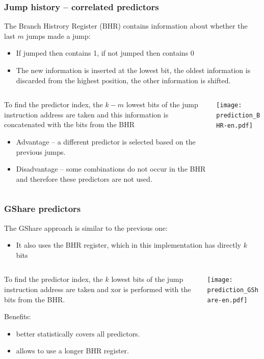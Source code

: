 \documentclass{beamer}
\begin{document}
\begin{frame}
\frametitle{Jump history -- correlated predictors}

The Branch Histrory Register (BHR) contains information about whether the last $m$ jumps made a jump:
\begin{itemize}
\item If jumped then contains 1, if not jumped then contains 0
\item The new information is inserted at the lowest bit, the oldest information is discarded from the highest position, the other information is shifted.
\end{itemize}

\begin{columns}[T]
\begin{column}{0.5\textwidth}
\small
To find the predictor index, the $k-m$ lowest bits of the jump instruction address are taken and this information is concatenated with the bits from the BHR
\begin{itemize}
\item Advantage -- a different predictor is selected based on the previous jumps.
\item Disadvantage -- some combinations do not occur in the BHR and therefore these predictors are not used.
\end{itemize}
\end{column}
\begin{column}{0.5\textwidth}
\texttt{[image: prediction\_BHR-en.pdf]}
\end{column}
\end{columns}

\end{frame}

\begin{frame}
\frametitle{GShare predictors}

The GShare approach is similar to the previous one:
\begin{itemize}
\item It also uses the BHR register, which in this implementation has directly $k$ bits
\end{itemize}

\begin{columns}[T]
\begin{column}{0.5\textwidth}
\small
To find the predictor index, the $k$ lowest bits of the jump instruction address are taken and xor is performed with the bits from the BHR.

Benefits:
\begin{itemize}
\item better statistically covers all predictors.
\item allows to use a longer BHR register.
\end{itemize}
\end{column}
\begin{column}{0.5\textwidth}
\texttt{[image: prediction\_GShare-en.pdf]}
\end{column}
\end{columns}
\end{frame}
\end{document}
